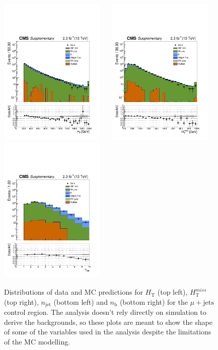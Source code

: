 \clearpage
\begin{figure}[tbhp]
    \caption{ 
    Distributions of data and MC predictions for $H_{\mathrm{T}}$ (top left), $H_{\mathrm{T}}^{miss}$ (top right), $n_{\mathrm{jet}}$ (bottom left) and $n_{\mathrm{b}}$ (bottom right) 
    for the $\mu+\mathrm{jets}$ control region. 
    The analysis doesn't rely directly on simulation to derive the backgrounds, 
    so these plots are meant to show the shape of some of the variables used in the analysis despite the limitations 
    of the MC modelling. 
    \label{fig:data-MC_plots_SingleMu} }
  \begin{center}
     \includegraphics[width=0.45\textwidth]{SingleMu_ht40_all_all_aux} ~~
     \includegraphics[width=0.45\textwidth]{SingleMu_mht40_pt_all_all_aux} \\
     \includegraphics[width=0.45\textwidth]{SingleMu_nJet40_all_all_aux} ~~

\end{center}
\end{figure}
